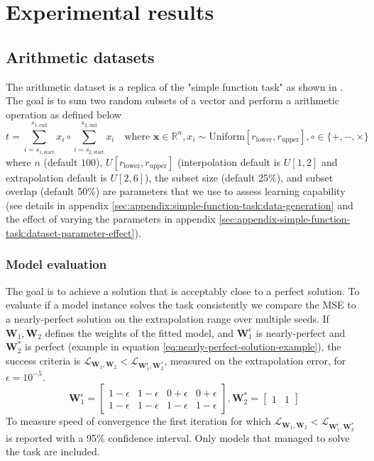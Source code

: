 \section{Experimental results}
\label{sec:experiments}

\subsection{Arithmetic datasets}
\label{sec:arithmetic-dataset}

The arithmetic dataset is a replica of the "simple function task" as shown in \cite{trask-nalu}.
The goal is to sum two random subsets of a vector and perform a arithmetic operation as defined below
\begin{equation}
t = \sum_{i = s_{1,\mathrm{start}}}^{s_{1,\mathrm{end}}} x_i \circ \sum_{i = s_{2,\mathrm{start}}}^{s_{2,\mathrm{end}}} x_i \quad \text{where } \mathbf{x} \in \mathbb{R}^n, x_i \sim \mathrm{Uniform}[r_{\mathrm{lower}}, r_{\mathrm{upper}}], \circ \in \{+, -, \times\}
\label{eq:arithmetic-problem}
\end{equation}
where $n$ (default $100$), $U[r_{\mathrm{lower}}, r_{\mathrm{upper}}]$ (interpolation default is $U[1,2]$ and extrapolation default is $U[2,6]$), the subset size (default 25\%), and subset overlap (default 50\%) are parameters that we use to assess learning capability (see details in appendix \ref{sec:appendix:simple-function-task:data-generation} and the effect of varying the parameters in appendix \ref{sec:appendix-simple-function-task:dataset-parameter-effect}).

\subsubsection{Model evaluation}
The goal is to achieve a solution that is acceptably close to a perfect solution. To evaluate if a model instance solves the task consistently we compare the MSE to a nearly-perfect solution on the extrapolation range over multiple seeds. If $\mathbf{W}_1, \mathbf{W}_2$ defines the weights of the fitted model, and $\mathbf{W}_1^\epsilon$ is nearly-perfect and $\mathbf{W}_2^*$ is perfect (example in equation \ref{eq:nearly-perfect-solution-example}), the success criteria is $\mathcal{L}_{\mathbf{W}_1, \mathbf{W}_2} < \mathcal{L}_{\mathbf{W}_1^\epsilon, \mathbf{W}_2^*}$, measured on the extrapolation error, for $\epsilon = 10^{-5}$.
\begin{equation}
    \mathbf{W}_1^\epsilon = \begin{bmatrix}
    1 - \epsilon & 1 - \epsilon & 0 + \epsilon & 0 + \epsilon \\
    1 - \epsilon & 1 - \epsilon & 1 - \epsilon & 1 - \epsilon
    \end{bmatrix}, \mathbf{W}_2^* = \begin{bmatrix}
    1 & 1
    \end{bmatrix}
    \label{eq:nearly-perfect-solution-example}
\end{equation}
To measure speed of convergence the first iteration for which $\mathcal{L}_{\mathbf{W}_1, \mathbf{W}_2} < \mathcal{L}_{\mathbf{W}_1^\epsilon, \mathbf{W}_2^*}$ is reported with a 95\% confidence interval. Only models that managed to solve the task are included.

